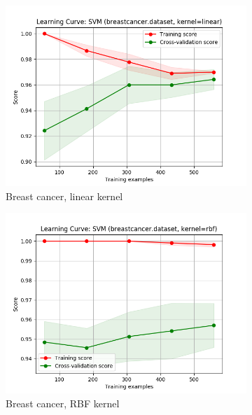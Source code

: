 \documentclass{article}
\begin{document}
\begin{figure}[htb]
    \begin{subfigure}{0.33\textwidth}
      \includegraphics[width=\linewidth]{out/svm/breastcancer-kernel-linear.png}
      \caption{Breast cancer, linear kernel}
      \label{fig:svm-learning-4}
    \end{subfigure}\hfil
    \begin{subfigure}{0.33\textwidth}
      \includegraphics[width=\linewidth]{out/svm/breastcancer-kernel-rbf.png}
      \caption{Breast cancer, RBF kernel}
      \label{fig:svm-learning-5}
    \end{subfigure}\hfil
    \begin{subfigure}{0.33\textwidth}

\end{subfigure}
\end{figure}
\end{document}
